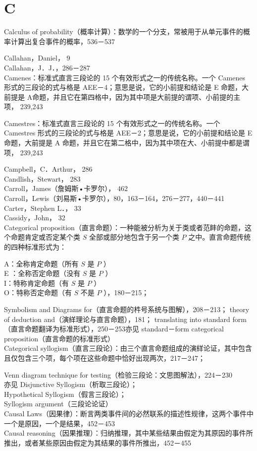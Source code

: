 \section*{C}
Calculus of probability（概率计算）：数学的一个分支，常被用于从单元事件的概率计算出复合事件的概率，536－537

Callahan，Daniel， 9\\
Callahan，J．J．，286－287\\
Camenes：标准式直言三段论的 15 个有效形式之一的传统名称。一个 Camenes 形式的三段论的式与格是 AEE－4；意思是说，它的小前提和结论是 E 命题，大前提是 A命题，并且它在第四格中，因为其中项是大前提的谓项、小前提的主项， 239,243

Camestres：标准式直言三段论的 15 个有效形式之一的传统名称。一个 Camestres 形式的三段论的式与格是 AEE－2；意思是说，它的小前提和结论是 E 命题，大前提是 A 命题，并且它在第二格中，因为其中项在大、小前提中都是谓项， 239,243

Campbell，C．Arthur， 286\\
Candlish，Stewart， 283\\
Carroll，James（詹姆斯•卡罗尔）， 462\\
Carroll，Lewis（刘易斯•卡罗尔），80，163－164，276－277，440－441\\
Carter，Stephen L．， 33\\
Cassidy，John， 32\\
Categorical proposition（直言命题）：一种能被分析为关于类或者范盽的命题，这个命题肯定或否定某个类 $S$ 全部或部分地包含于另一个类 $P$ 之中。直言命题传统的四种标准形式为：

A：全称肯定命题（所有 $S$ 是 $P$ ）\\
E ：全称否定命题（没有 $S$ 是 $P$ ）\\
I：特称肯定命题（有 $S$ 是 $P$ ）\\
O：特称否定命题（有 $S$ 不是 $P$ ），180－215；

Symbolism and Diagrams for（直言命题的㭌号系统与图解），208－213； theory of deduction and（演絴理论与直言命题），181； translating into standard form（直言命题翻译为标准形式），250－253亦见 standard－form categorical proposition（直言命题的标准形式）\\
Categorical syllogism（直言三段论）：由三个直言命题组成的演絴论证，其中包含且仅包含三个项，每个项在这些命题中恰好出现两次，217－247；

Venn diagram technique for testing（检验三段论：文思图解法），224－230\\
亦见 Disjunctive Syllogism（析取三段论）；\\
Hypothetical Syllogism（假言三段论）；\\
Syllogism argument（三段论论证）\\
Causal Laws（因果律）：断言两类事件间的必然联系的描述性规律，这两个事件中一个是原因，一个是结果，452－453\\
Causal reasoning（因果推理）：归纳推理，其中某些结果由假定为其原因的事件所推出，或者某些原因由假定为其结果的事件所推出，452－455

